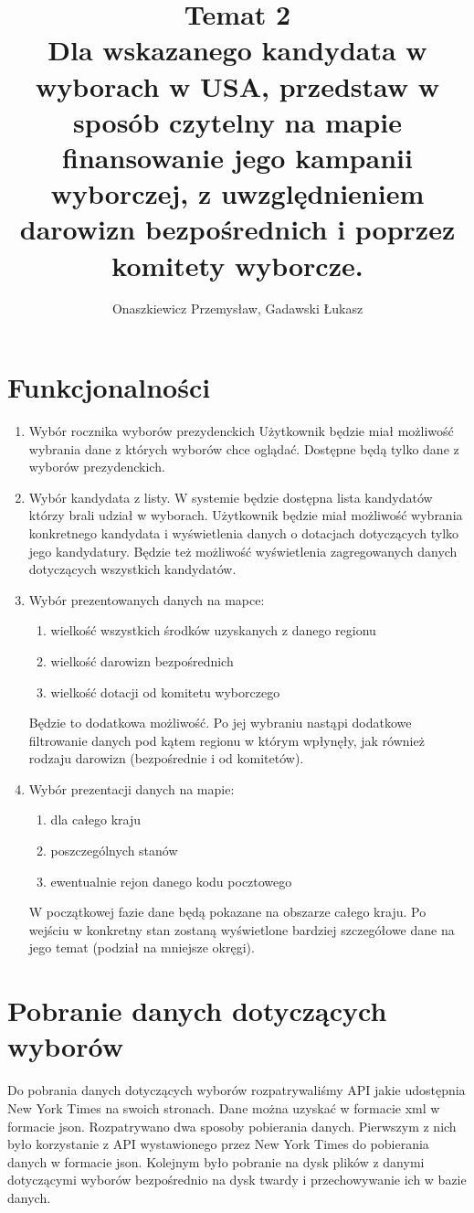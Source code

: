 \documentclass[10pt,a4paper]{article}
\author{Onaszkiewicz Przemysław, Gadawski Łukasz}
\title{Temat 2\\ Dla wskazanego kandydata w wyborach w USA, przedstaw w sposób czytelny na mapie finansowanie jego kampanii wyborczej, z uwzględnieniem darowizn bezpośrednich i poprzez komitety wyborcze. 
}
\begin{document}
\maketitle

\section{Funkcjonalności}
\begin{enumerate}
\item Wybór rocznika wyborów prezydenckich  
Użytkownik będzie miał możliwość wybrania dane z których wyborów chce oglądać. Dostępne będą tylko dane z wyborów prezydenckich.
\item Wybór kandydata z listy. W systemie będzie dostępna lista kandydatów którzy brali udział w wyborach. Użytkownik będzie miał możliwość wybrania konkretnego kandydata i wyświetlenia danych o dotacjach dotyczących tylko jego kandydatury. Będzie też możliwość wyświetlenia zagregowanych danych dotyczących wszystkich kandydatów. 
\item Wybór prezentowanych danych na mapce:
\begin{enumerate}
\item wielkość wszystkich środków uzyskanych z danego regionu 
\item wielkość darowizn bezpośrednich
\item wielkość dotacji od komitetu wyborczego 
\end{enumerate}
 Będzie to dodatkowa możliwość. Po jej wybraniu nastąpi dodatkowe filtrowanie danych pod kątem regionu w którym wpłynęły, jak również rodzaju darowizn (bezpośrednie i od komitetów).
\item Wybór prezentacji danych na mapie:
\begin{enumerate}
\item dla całego kraju
\item poszczególnych stanów
\item ewentualnie rejon danego kodu pocztowego
\end{enumerate}

W początkowej fazie dane będą pokazane na obszarze całego kraju. Po wejściu w 
konkretny  stan zostaną wyświetlone bardziej szczegółowe dane na jego temat 
(podział na mniejsze okręgi). 

\end{enumerate}
\section{Pobranie danych dotyczących wyborów}
Do pobrania danych dotyczących wyborów rozpatrywaliśmy API jakie udostępnia New York Times na swoich stronach. Dane można uzyskać w formacie xml w formacie json.   
Rozpatrywano dwa sposoby pobierania danych. Pierwszym z nich było korzystanie z API wystawionego przez New York Times  do pobierania danych w formacie json. Kolejnym było pobranie na dysk plików z danymi dotyczącymi wyborów bezpośrednio na dysk twardy i przechowywanie ich w bazie danych.
\end{document}
